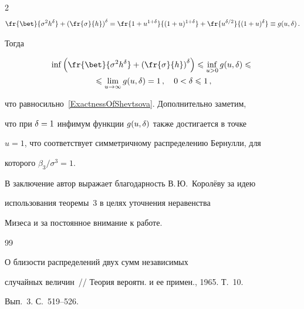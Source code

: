 \begin{multicols}{2}
\begin{gather*}
\fr{\bet}{\sigma^2 h^\d} + \left(\fr{\sigma}{h}\right)^\d=

\fr{1+u^{1+\d}}{(1+u)^{1+\d}}+\fr{u^{\d/2}}{(1+u)^\d}\equiv

g(u,\d)\,.

\end{gather*}

Тогда

\begin{multline*}

\inf \left(\fr{\bet}{\sigma^2 h^\d} +

\left(\fr{\sigma}{h}\right)^\d\right)\le\inf_{u>0}

g(u,\d)\le{}\\

{}\le

\lim_{u\to\infty} g(u,\d) =1\,,\quad 0<\d\le 1\,,

\end{multline*}

что равносильно~\eqref{ExactnessOfShevtsova}. Дополнительно заметим,

что при $\delta=1$ инфимум функции $g(u,\delta)$ также достигается в точке

$u=1$, что соответствует сим\-мет\-рич\-но\-му распределению Бернулли, для

которого $\beta_3/\sigma^3=1$.

\medskip



В заключение автор выражает благодарность В.\,Ю.~Королёву за идею

использования теоремы~3 в целях уточнения неравенства

Мизеса и за постоянное внимание к работе.





{\small\frenchspacing

{%


\begin{thebibliography}{99}





О близости распределений двух сумм независимых

случайных величин~// Теория вероятн. и ее примен., 1965. Т.~10.

Вып.~3. С.~519--526.






\end{thebibliography}}}
\end{multicols}
